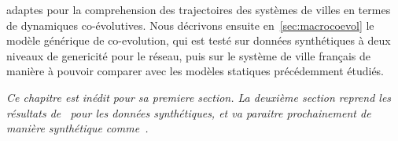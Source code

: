 adaptes pour la comprehension des trajectoires des systèmes de villes en termes de dynamiques co-évolutives. Nous décrivons ensuite en~\ref{sec:macrocoevol} le modèle générique de co-evolution, qui est testé sur données synthétiques à deux niveaux de genericité pour le réseau, puis sur le système de ville français de manière à pouvoir comparer avec les modèles statiques précédemment étudiés.




\stars


\textit{Ce chapitre est inédit pour sa premiere section. La deuxième section reprend les résultats de~\cite{} %
pour les données synthétiques, et va paraitre prochainement de manière synthétique comme~\cite{}. %
}















